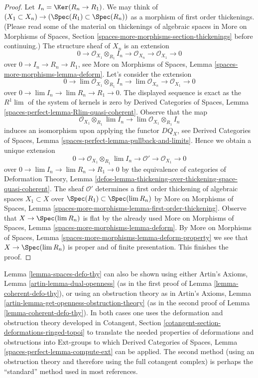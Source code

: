 \begin{proof}
\medskip\noindent
Let $I_n = \Ker(R_n \to R_1)$. We may think of
$(X_1 \subset X_n) \to (\Spec(R_1) \subset \Spec(R_n))$
as a morphism of first order thickenings. (Please read some of the material
on thickenings of algebraic spaces in More on Morphisms of Spaces, Section
\ref{spaces-more-morphisms-section-thickenings}
before continuing.) The structure sheaf of $X_n$ is an extension
$$
0 \to \mathcal{O}_{X_1} \otimes_{R_1} I_n \to
\mathcal{O}_{X_n} \to \mathcal{O}_{X_1} \to 0
$$
over $0 \to I_n \to R_n \to R_1$, see
More on Morphisms of Spaces, Lemma
\ref{spaces-more-morphisms-lemma-deform}.
Let's consider the extension
$$
0 \to \lim \mathcal{O}_{X_1} \otimes_{R_1} I_n \to
\lim \mathcal{O}_{X_n} \to \mathcal{O}_{X_1} \to 0
$$
over $0 \to \lim I_n \to \lim R_n \to R_1 \to 0$.
The displayed sequence is exact as the $R^1\lim$ of the system
of kernels is zero by Derived Categories of Spaces, Lemma
\ref{spaces-perfect-lemma-Rlim-quasi-coherent}.
Observe that the map
$$
\mathcal{O}_{X_1} \otimes_{R_1} \lim I_n \longrightarrow
\lim \mathcal{O}_{X_1} \otimes_{R_1} I_n
$$
induces an isomorphism upon applying the functor $DQ_X$, see
Derived Categories of Spaces, Lemma
\ref{spaces-perfect-lemma-pullback-and-limits}.
Hence we obtain a unique extension
$$
0 \to \mathcal{O}_{X_1} \otimes_{R_1} \lim I_n \to
\mathcal{O}' \to \mathcal{O}_{X_1} \to 0
$$
over $0 \to \lim I_n \to \lim R_n \to R_1 \to 0$
by the equivalence of categories of
Deformation Theory, Lemma
\ref{defos-lemma-thickening-over-thickening-space-quasi-coherent}.
The sheaf $\mathcal{O}'$ determines
a first order thickening of algebraic spaces $X_1 \subset X$
over $\Spec(R_1) \subset \Spec(\lim R_n)$
by More on Morphisms of Spaces, Lemma
\ref{spaces-more-morphisms-lemma-first-order-thickening}.
Observe that $X \to \Spec(\lim R_n)$ is flat by the already
used More on Morphisms of Spaces, Lemma
\ref{spaces-more-morphisms-lemma-deform}.
By More on Morphisms of Spaces, Lemma
\ref{spaces-more-morphisms-lemma-deform-property}
we see that $X \to \Spec(\lim R_n)$ is proper
and of finite presentation.
This finishes the proof.
\end{proof}

\begin{remark}
\label{remark-spaces-defo-thy}
Lemma \ref{lemma-spaces-defo-thy} can also be shown using either
Artin's Axioms, Lemma \ref{artin-lemma-dual-openness}
(as in the first proof of
Lemma \ref{lemma-coherent-defo-thy}), or using an obstruction theory
as in Artin's Axioms, Lemma \ref{artin-lemma-get-openness-obstruction-theory}
(as in the second proof of
Lemma \ref{lemma-coherent-defo-thy}).
In both cases one uses the deformation and obstruction theory developed in
Cotangent, Section \ref{cotangent-section-deformations-ringed-topoi}
to translate the needed properties of deformations and obstructions
into $\text{Ext}$-groups to which
Derived Categories of Spaces, Lemma
\ref{spaces-perfect-lemma-compute-ext}
can be applied.
The second method (using an obstruction theory and therefore
using the full cotangent complex) is perhaps the ``standard'' method used
in most references.
\end{remark}





